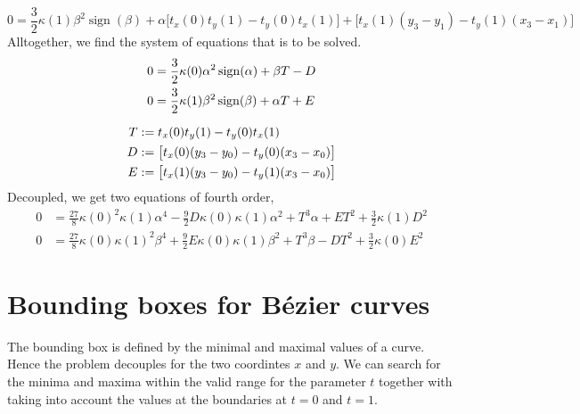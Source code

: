 \documentclass{article}
\newcommand{\sign}{\operatorname{sign}}
\begin{document}
\begin{equation}
  0 = \frac{3}{2}\kappa(1) \beta^2 \sign(\beta)
    + \alpha \bigl[t_x(0)t_y(1) - t_y(0)t_x(1)\bigr]
    + \bigl[t_x(1) (y_3-y_1) - t_y(1) (x_3-x_1)\bigr]
\end{equation}
%
Alltogether, we find the system of equations that is to be solved.
%
\begin{gather}
  \begin{aligned}
    0 &= \frac{3}{2} \kappa(0) \alpha^2 \sign(\alpha) + \beta T - D \\
    0 &= \frac{3}{2} \kappa(1) \beta^2 \sign(\beta) + \alpha T + E
  \end{aligned}\\[\medskipamount]
  \begin{aligned}
    T &:= t_x(0)t_y(1) - t_y(0)t_x(1) \\
    D &:= \bigl[t_x(0) (y_3-y_0) - t_y(0) (x_3-x_0)\bigr]\\
    E &:= \bigl[t_x(1) (y_3-y_0) - t_y(1) (x_3-x_0)\bigr]
  \end{aligned}
\end{gather}
%
Decoupled, we get two equations of fourth order,
%
\begin{align}
  0 &= \frac{27}{8} \kappa(0)^2\kappa(1) \alpha^4
     - \frac{9}{2}D\kappa(0)\kappa(1)\alpha^2
     + T^3 \alpha
     + E T^2 + \frac{3}{2}\kappa(1) D^2 \\
   0 &= \frac{27}{8} \kappa(0)\kappa(1)^2\beta^4
     + \frac{9}{2}E\kappa(0)\kappa(1)\beta^2
     + T^3 \beta
     - D T^2 + \frac{3}{2}\kappa(0) E^2
\end{align}
%

\section{Bounding boxes for B\'ezier curves}

The bounding box is defined by the minimal and maximal values of a
curve. Hence the problem decouples for the two coordintes $x$ and $y$.
We can search for the minima and maxima within the valid range for the
parameter $t$ together with taking into account the values at the
boundaries at $t=0$ and $t=1$.
\end{document}
